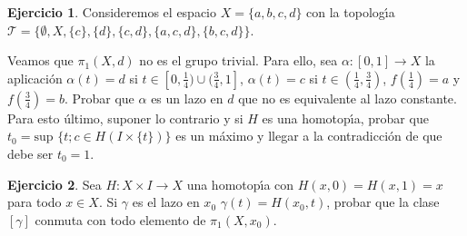 \documentclass{article}
\theoremstyle{plain}
\theoremstyle{definition}
\newtheorem{exercise}{Ejercicio}
\begin{document}
\newpage \begin{exercise} Consideremos el espacio $X = \{a,b,c,d\}$ con la topolog\'{\i}a $\mathcal{T} = \{\emptyset, X, \{c\},\{d\}, \{c,d\}, \{a,c,d\}, \{b,c,d\}\}$.
\par
 Veamos que $\pi_1(X,d)$ no es el grupo trivial. Para ello, sea $\alpha: [0,1]\to X$ la aplicaci\'on $\alpha(t) = d$ si $t \in [0,\frac{1}{4}) \cup (\frac{3}{4},1]$, $\alpha(t) = c$ si $t\in (\frac{1}{4},\frac{3}{4})$, $f(\frac{1}{4}) = a$ y $f(\frac{3}{4}) = b$.  Probar que $\alpha$ es un lazo en $d$ que no es equivalente al lazo constante. Para esto \'ultimo, suponer lo contrario y si $H$ es una homotop\'{\i}a, probar que $t_0 = \mbox{sup }\{t; c\in H(I\times \{t\})\}$ es un m\'aximo y llegar a la contradicci\'on de que debe ser $t_0 = 1$.
\end{exercise} 

\newpage \begin{exercise} Sea $H: X\times I \to X$ una homotop\'{\i}a con $H(x,0) =  H(x,1) = x$ para todo $x\in X$. Si $\gamma$ es el lazo en $x_0$ $\gamma(t) = H(x_0,t)$, probar que la clase $[\gamma]$ conmuta con todo elemento de $\pi_1(X,x_0)$.
\end{exercise}
\end{document}
